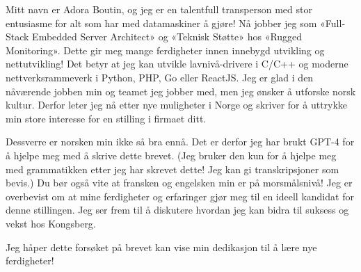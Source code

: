 \documentclass[a4paper,12pt]{article}
\begin{document}

\begin{coverletter}
    Mitt navn er Adora Boutin, og jeg er en talentfull transperson med stor entusiasme for alt som har med datamaskiner å gjøre! Nå jobber jeg som «Full-Stack Embedded Server Architect» og «Teknisk Støtte» hos «Rugged Monitoring».
    Dette gir meg mange ferdigheter innen innebygd utvikling og nettutvikling! Det betyr at jeg kan utvikle lavnivå-drivere i C/C++ og moderne nettverksrammeverk i Python, PHP, Go eller ReactJS.
    Jeg er glad i den nåværende jobben min og teamet jeg jobber med, men jeg ønsker å utforske norsk kultur.
    Derfor leter jeg nå etter nye muligheter i Norge og skriver for å uttrykke min store interesse for en stilling i firmaet ditt.\newline


    Dessverre er norsken min ikke så bra ennå.
    Det er derfor jeg har brukt GPT-4 for å hjelpe meg med å skrive dette brevet.
    (Jeg bruker den kun for å hjelpe meg med grammatikken etter jeg har skrevet dette! Jeg kan gi transkripsjoner som bevis.) Du bør også vite at fransken og engelsken min er på morsmålsnivå! Jeg er overbevist om at mine ferdigheter og erfaringer gjør meg til en ideell kandidat for denne stillingen.
    Jeg ser frem til å diskutere hvordan jeg kan bidra til suksess og vekst hos Kongsberg.\newline


    Jeg håper dette forsøket på brevet kan vise min dedikasjon til å lære nye ferdigheter!
\end{coverletter}
\end{document}

